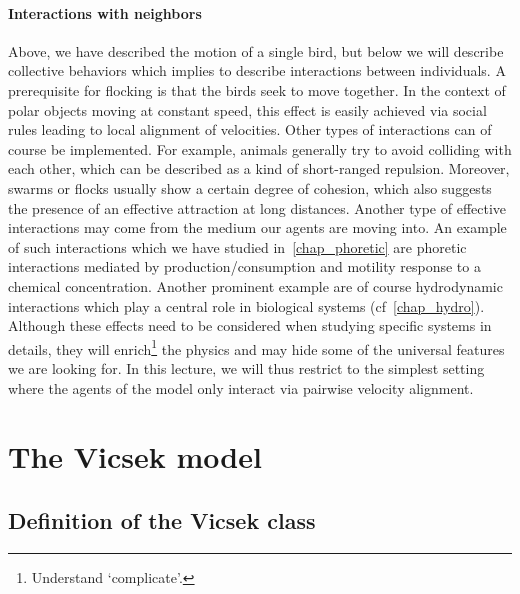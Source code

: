  \paragraph*{Interactions with neighbors}
 Above, we have described the motion of a single bird, but below we will describe collective behaviors which implies to describe interactions between individuals.
 A prerequisite for flocking is that the birds seek to move together. 
 In the context of polar objects moving at constant speed, this effect is easily achieved via social rules leading to local alignment of velocities.
 Other types of interactions can of course be implemented. 
 For example, animals generally try to avoid colliding with each other, which can be described as a kind of short-ranged repulsion. Moreover, swarms or flocks usually show a certain degree of cohesion, which also suggests the presence of an effective attraction at long distances. 
 Another type of effective interactions may come from the medium our agents are moving into. An example of such interactions which we have studied in~\autoref{chap_phoretic} are phoretic interactions mediated by production/consumption and motility response to a chemical concentration. 
 Another prominent example are of course hydrodynamic interactions which play a central role in biological systems (cf~\autoref{chap_hydro}).
 Although these effects need to be considered when studying specific systems in details, they will enrich\footnote{Understand `complicate'.} the physics and may hide some of the universal features we are looking for. 
 In this lecture, we will thus restrict to the simplest setting where the agents of the model only interact via pairwise velocity alignment.


\section{The Vicsek model}

\subsection{Definition of the Vicsek class}

